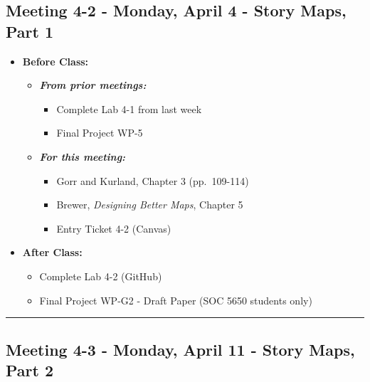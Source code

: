 \documentclass[
]{book}
\providecommand{\tightlist}{%
  \setlength{\itemsep}{0pt}\setlength{\parskip}{0pt}}
\begin{document}
\hypertarget{meeting-4-2---monday-april-4---story-maps-part-1}{%
\subsection*{Meeting 4-2 - Monday, April 4 - Story Maps, Part 1}\label{meeting-4-2---monday-april-4---story-maps-part-1}}

\begin{itemize}
\tightlist
\item
  \textbf{Before Class:}

  \begin{itemize}
  \tightlist
  \item
    \textbf{\emph{From prior meetings:}}

    \begin{itemize}
    \tightlist
    \item
      Complete Lab 4-1 from last week
    \item
      Final Project WP-5
    \end{itemize}
  \item
    \textbf{\emph{For this meeting:}}

    \begin{itemize}
    \tightlist
    \item
      Gorr and Kurland, Chapter 3 (pp.~109-114)
    \item
      Brewer, \emph{Designing Better Maps}, Chapter 5
    \item
      Entry Ticket 4-2 (Canvas)
    \end{itemize}
  \end{itemize}
\item
  \textbf{After Class:}

  \begin{itemize}
  \tightlist
  \item
    Complete Lab 4-2 (GitHub)
  \item
    Final Project WP-G2 - Draft Paper (SOC 5650 students only)
  \end{itemize}
\end{itemize}

\begin{center}\rule{0.5\linewidth}{0.5pt}\end{center}

\hypertarget{meeting-4-3---monday-april-11---story-maps-part-2}{%
\subsection*{Meeting 4-3 - Monday, April 11 - Story Maps, Part 2}\label{meeting-4-3---monday-april-11---story-maps-part-2}}
\end{document}
